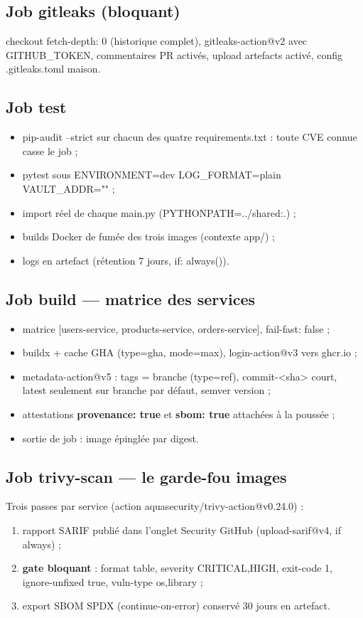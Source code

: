 \documentclass[12pt,a4paper,twoside,openright]{report}
\begin{document}
\subsection{Job gitleaks (bloquant)}
checkout fetch-depth: 0 (historique complet), gitleaks-action@v2 avec GITHUB\_TOKEN, commentaires PR activés, upload artefacts activé, config .gitleaks.toml maison.

\subsection{Job test}
\begin{itemize}[itemsep=1pt]
  \item pip-audit --strict sur chacun des quatre requirements.txt : toute CVE connue casse le job ;
  \item pytest sous ENVIRONMENT=dev LOG\_FORMAT=plain VAULT\_ADDR="" ;
  \item import réel de chaque main.py (PYTHONPATH=../shared:.) ;
  \item builds Docker de fumée des trois images (contexte app/) ;
  \item logs en artefact (rétention 7 jours, if: always()).
\end{itemize}

\subsection{Job build --- matrice des services}
\begin{itemize}[itemsep=1pt]
  \item matrice [users-service, products-service, orders-service], fail-fast: false ;
  \item buildx + cache GHA (type=gha, mode=max), login-action@v3 vers ghcr.io ;
  \item metadata-action@v5 : tags = branche (type=ref), commit-<sha> court, latest seulement sur branche par défaut, semver {{version}} ;
  \item attestations \textbf{provenance: true} et \textbf{sbom: true} attachées à la poussée ;
  \item sortie de job : image épinglée par digest.
\end{itemize}

\subsection{Job trivy-scan --- le garde-fou images}
Trois passes par service (action aquasecurity/trivy-action@v0.24.0) :
\begin{enumerate}[itemsep=1pt]
  \item rapport SARIF publié dans l'onglet Security GitHub (upload-sarif@v4, if always) ;
  \item \textbf{gate bloquant} : format table, severity CRITICAL,HIGH, exit-code 1, ignore-unfixed true, vuln-type os,library ;
  \item export SBOM SPDX (continue-on-error) conservé 30 jours en artefact.
\end{enumerate}
\end{document}
